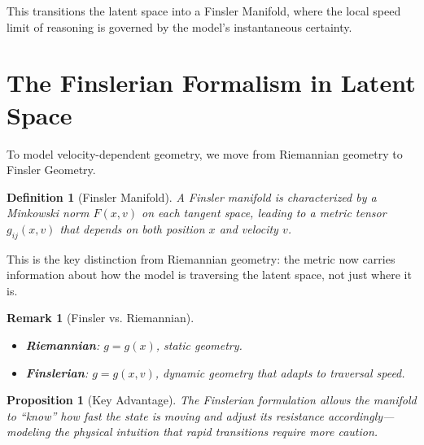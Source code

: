 \documentclass[12pt,letterpaper,twoside]{article}
\newtheorem{definition}{Definition}[section]
\newtheorem{remarque}{Remark}[section]
\newtheorem{prop}{Proposition}[section]
\begin{document}
This transitions the latent space into a Finsler Manifold, where the local speed limit of reasoning is governed by the model's instantaneous certainty.

\section{The Finslerian Formalism in Latent Space}

To model velocity-dependent geometry, we move from Riemannian geometry to Finsler Geometry.

\begin{definition}[Finsler Manifold]
A Finsler manifold is characterized by a Minkowski norm $F(x, v)$ on each tangent space, leading to a metric tensor $g_{ij}(x, v)$ that depends on both position $x$ and velocity $v$.
\end{definition}

This is the key distinction from Riemannian geometry: the metric now carries information about how the model is traversing the latent space, not just where it is.

\begin{remarque}[Finsler vs. Riemannian]
\begin{itemize}
\item \textbf{Riemannian}: $g = g(x)$, static geometry.
\item \textbf{Finslerian}: $g = g(x, v)$, dynamic geometry that adapts to traversal speed.
\end{itemize}
\end{remarque}

\begin{prop}[Key Advantage]
The Finslerian formulation allows the manifold to ``know'' how fast the state is moving and adjust its resistance accordingly---modeling the physical intuition that rapid transitions require more caution.
\end{prop}
\end{document}

